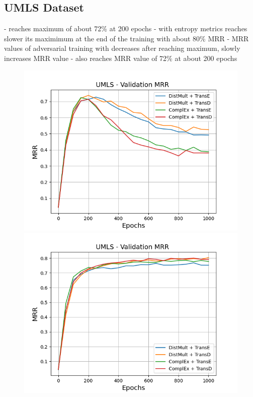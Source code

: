 \subsection{UMLS Dataset}
\label{subsec:uncertainty_umls}


- \origsampling reaches maximum of about 72\% at 200 epochs
- \ussoftmax with entropy metrics reaches slower its maximimum at the end of the training with about 80\% MRR
- MRR values of adversarial training with \origsampling decreases after reaching maximum, \ussoftmax slowly increases MRR value
- \ussoftmax also reaches MRR value of 72\% at about 200 epochs


\begin{figure}
    \centering
    \begin{minipage}{.5\textwidth}
      \centering
      \includegraphics[width=0.9\linewidth]{figures/results/gan_train/not_pretrained/random/umls/random_umls_mrrs.png}
    \end{minipage}%
    \begin{minipage}{.5\textwidth}
      \centering
      \includegraphics[width=0.9\linewidth]{figures/results/gan_train/not_pretrained/uncertainty/max_distribution/entropy/umls/uncertainty_umls_mrrs.png}

\end{minipage}
\end{figure}
